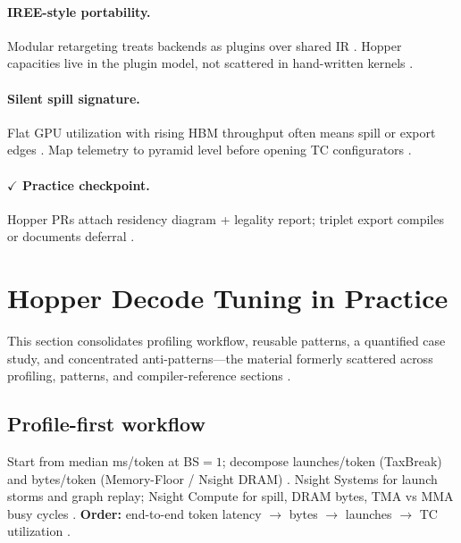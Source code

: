 \paragraph{IREE-style portability.}
Modular retargeting treats backends as plugins over shared IR \citep{iree2024,yirage2026,chen2020compilerbasedhardw}.
Hopper capacities live in the plugin model, not scattered in hand-written kernels \citep{patel2025llminference,nvidia2022hopper}.

\paragraph{Silent spill signature.}
Flat GPU utilization with rising HBM throughput often means spill or export edges \citep{memoryfloor2026,nvidia2022hopper,patel2025llminference}.
Map telemetry to pyramid level before opening TC configurators \citep{taxbreak2026,yirage2026}.

\paragraph{$\checkmark$ Practice checkpoint.}
Hopper PRs attach residency diagram + legality report; triplet export compiles or documents deferral \citep{yirage2026,amd2024xdna}.

\section{Hopper Decode Tuning in Practice}
\label{sec:hopper_tuning_practice}

This section consolidates profiling workflow, reusable patterns, a quantified case study, and concentrated anti-patterns---the material formerly scattered across profiling, patterns, and compiler-reference sections \citep{patel2025llminference,taxbreak2026}.

\subsection{Profile-first workflow}
Start from median ms/token at BS${=}1$; decompose launches/token (TaxBreak) and bytes/token (Memory-Floor / Nsight DRAM) \citep{taxbreak2026,memoryfloor2026}.
Nsight Systems for launch storms and graph replay; Nsight Compute for spill, DRAM bytes, TMA vs MMA busy cycles \citep{patel2025llminference,semianalysis2024tma}.
\textbf{Order:} end-to-end token latency $\rightarrow$ bytes $\rightarrow$ launches $\rightarrow$ TC utilization \citep{memoryfloor2026}.

